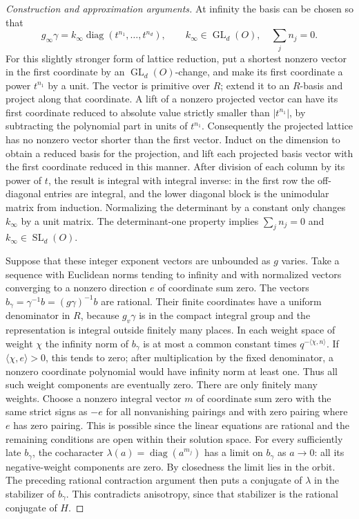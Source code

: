 \documentclass[11pt,a4paper,openany,oneside]{book}
\theoremstyle{resultstyle}
\theoremstyle{definition}
\numberwithin{equation}{chapter}
\begin{document}
\begin{proof}[Construction and approximation arguments]
At infinity the basis can be chosen so that
\[
 g_\infty\gamma = k_\infty\operatorname{diag}
          (t^{n_1},\ldots,t^{n_d}),\qquad
 k_\infty\in\operatorname{GL}_d(O),\quad
 \sum_j n_j=0.
\]
For this slightly stronger form of lattice reduction, put a
shortest nonzero vector in the first coordinate by an
\(\operatorname{GL}_d(O)\)-change, and make its first
coordinate a power \(t^{n_1}\) by a unit. The vector is
primitive over \(R\); extend it to an \(R\)-basis and project
along that coordinate. A lift of a nonzero projected vector
can have its first coordinate reduced to absolute value
strictly smaller than \(|t^{n_1}|\), by subtracting the
polynomial part in units of \(t^{n_1}\). Consequently the
projected lattice has no nonzero vector shorter than the first
vector. Induct on the dimension to obtain a reduced basis for
the projection, and lift each projected basis vector with the
first coordinate reduced in this manner. After division of
each column by its power of \(t\), the result is integral
with integral inverse: in the first row the off-diagonal
entries are integral, and the lower diagonal block is the
unimodular matrix from induction. Normalizing the determinant
by a constant only changes \(k_\infty\) by a unit matrix.
The determinant-one property implies \(\sum_j n_j=0\) and \(k_\infty\in\operatorname{SL}_d(O)\).

Suppose that these integer exponent vectors are unbounded as
\(g\) varies. Take a sequence with Euclidean norms tending to
infinity and with normalized vectors converging to a nonzero
direction \(e\) of coordinate sum zero. The vectors
\(b_\gamma=\gamma^{-1}b=(g\gamma)^{-1}b\) are rational. Their
finite coordinates have a uniform denominator in \(R\),
because \(g_v\gamma\) is in the compact integral group and
the representation is integral outside finitely many places.
In each weight space of weight \(\chi\) the infinity norm of
\(b_\gamma\) is at most a common constant times
\(q^{-\langle\chi,n\rangle}\). If
\(\langle\chi,e\rangle>0\), this tends to zero; after
multiplication by the fixed denominator, a nonzero coordinate
polynomial would have infinity norm at least one. Thus all
such weight components are eventually zero. There are only
finitely many weights. Choose a nonzero integral vector
\(m\) of coordinate sum zero with the same strict signs as
\(-e\) for all nonvanishing pairings and with zero pairing
where \(e\) has zero pairing. This is possible since the
linear equations are rational and the remaining conditions
are open within their solution space. For every sufficiently
late \(b_\gamma\), the cocharacter
\(\lambda(a)=\operatorname{diag}(a^{m_j})\) has a limit on
\(b_\gamma\) as \(a\to0\): all its negative-weight components
are zero. By closedness the limit lies in the orbit. The
preceding rational contraction argument then puts a conjugate of
\(\lambda\) in the stabilizer of \(b_\gamma\). This contradicts
anisotropy, since that stabilizer is the rational conjugate of
\(H\).


\end{proof}
\end{document}
